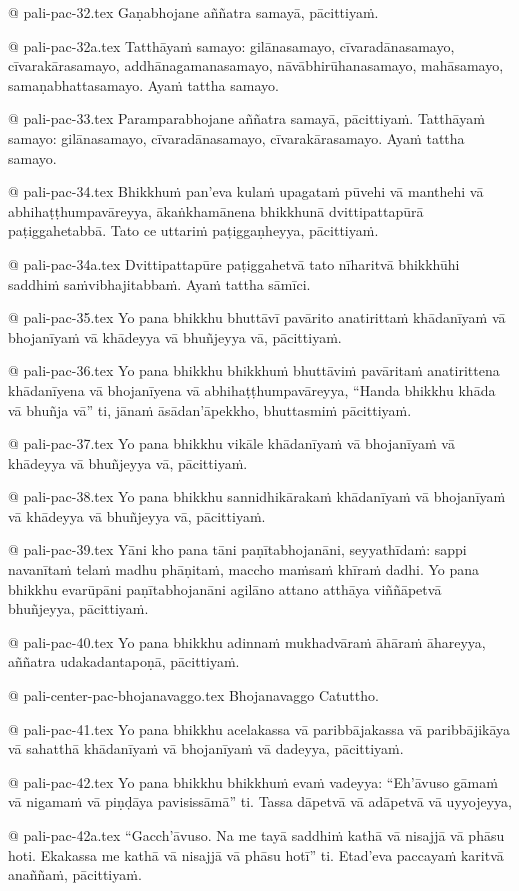 @ pali-pac-32.tex
Gaṇabhojane aññatra samayā, pācittiyaṁ.

@ pali-pac-32a.tex
Tatthāyaṁ samayo: gilānasamayo, cīvaradānasamayo, cīvarakārasamayo, addhānagamanasamayo, nāvābhirūhanasamayo, mahāsamayo, samaṇabhattasamayo. Ayaṁ tattha samayo.

@ pali-pac-33.tex
Paramparabhojane aññatra samayā, pācittiyaṁ. Tatthāyaṁ samayo: gilānasamayo, cīvaradānasamayo, cīvarakārasamayo. Ayaṁ tattha samayo.

@ pali-pac-34.tex
Bhikkhuṁ pan’eva kulaṁ upagataṁ pūvehi vā manthehi vā abhihaṭṭhumpavāreyya, ākaṅkhamānena bhikkhunā dvittipattapūrā paṭiggahetabbā. Tato ce uttariṁ paṭiggaṇheyya, pācittiyaṁ.

@ pali-pac-34a.tex
Dvittipattapūre paṭiggahetvā tato nīharitvā bhikkhūhi saddhiṁ saṁvibhajitabbaṁ. Ayaṁ tattha sāmīci.

@ pali-pac-35.tex
Yo pana bhikkhu bhuttāvī pavārito anatirittaṁ khādanīyaṁ vā bhojanīyaṁ vā khādeyya vā bhuñjeyya vā, pācittiyaṁ.

@ pali-pac-36.tex
Yo pana bhikkhu bhikkhuṁ bhuttāviṁ pavāritaṁ anatirittena khādanīyena vā bhojanīyena vā abhihaṭṭhumpavāreyya, “Handa bhikkhu khāda vā bhuñja vā” ti, jānaṁ āsādan’āpekkho, bhuttasmiṁ pācittiyaṁ.

@ pali-pac-37.tex
Yo pana bhikkhu vikāle khādanīyaṁ vā bhojanīyaṁ vā khādeyya vā bhuñjeyya vā, pācittiyaṁ.

@ pali-pac-38.tex
Yo pana bhikkhu sannidhikārakaṁ khādanīyaṁ vā bhojanīyaṁ vā khādeyya vā bhuñjeyya vā, pācittiyaṁ.

@ pali-pac-39.tex
Yāni kho pana tāni paṇītabhojanāni, seyyathīdaṁ: sappi navanītaṁ telaṁ madhu phāṇitaṁ, maccho maṁsaṁ khīraṁ dadhi. Yo pana bhikkhu evarūpāni paṇītabhojanāni agilāno attano atthāya viññāpetvā bhuñjeyya, pācittiyaṁ.

@ pali-pac-40.tex
Yo pana bhikkhu adinnaṁ mukhadvāraṁ āhāraṁ āhareyya,
aññatra udakadantapoṇā, pācittiyaṁ.

@ pali-center-pac-bhojanavaggo.tex
Bhojanavaggo Catuttho.

@ pali-pac-41.tex
Yo pana bhikkhu acelakassa vā paribbājakassa vā paribbājikāya vā sahatthā khādanīyaṁ vā bhojanīyaṁ vā dadeyya, pācittiyaṁ.

@ pali-pac-42.tex
Yo pana bhikkhu bhikkhuṁ evaṁ vadeyya: “Eh’āvuso gāmaṁ vā nigamaṁ vā piṇḍāya pavisissāmā” ti. Tassa dāpetvā vā adāpetvā vā uyyojeyya,

@ pali-pac-42a.tex
“Gacch’āvuso. Na me tayā saddhiṁ kathā vā nisajjā vā phāsu hoti. Ekakassa me kathā vā nisajjā vā phāsu hotī” ti. Etad’eva paccayaṁ karitvā anaññaṁ, pācittiyaṁ.

